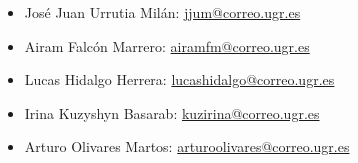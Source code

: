 \documentclass[12pt]{article}
\newcommand{\email}[1]{\href{mailto:#1}{{{\color{blue}#1}}}}
\begin{document}

    
    

    \begin{itemize}
        \item[]José Juan Urrutia Milán:
        \email{jjum@correo.ugr.es}

        \item[]Airam Falcón Marrero:
        \email{airamfm@correo.ugr.es}

        \item[]Lucas Hidalgo Herrera:
        \email{lucashidalgo@correo.ugr.es}

        \item[]Irina Kuzyshyn Basarab:
        \email{kuzirina@correo.ugr.es}

        \item[]Arturo Olivares Martos:
        \email{arturoolivares@correo.ugr.es}
    \end{itemize}
    \newpage

    \tableofcontents
    \newpage
    \fancyhead[R]{\helv \nouppercase{\rightmark}}
\end{document}
